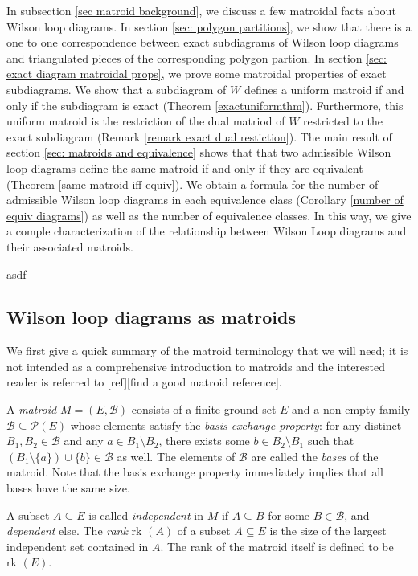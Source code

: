 \documentclass[11pt]{article}
\newcommand{\rk}{\textrm{rk }}
\newcommand{\cP}{\mathcal{P}}
\newcommand{\cB}{\mathcal{B}}
\theoremstyle{remark}
\theoremstyle{definition}
\begin{document}
In subsection \ref{sec matroid background}, we discuss a few matroidal facts about Wilson loop diagrams. In section \ref{sec: polygon partitions}, we show that there is a one to one correspondence between exact subdiagrams of Wilson loop diagrams and triangulated pieces of the corresponding polygon partion. In section \ref{sec: exact diagram matroidal props}, we prove some matroidal properties of exact subdiagrams. We show that a subdiagram of $W$ defines a uniform matroid if and only if the subdiagram is exact (Theorem \ref{exactuniformthm}). Furthermore, this uniform matroid is the restriction of the dual matriod of $W$ restricted to the exact subdiagram (Remark \ref{remark exact dual restiction}). The main result of section \ref{sec: matroids and equivalence} shows that that two admissible Wilson loop diagrams define the same matroid if and only if they are equivalent (Theorem \ref{same matroid iff equiv}). We obtain a formula for the number of admissible Wilson loop diagrams in each equivalence class (Corollary \ref{number of equiv diagrams}) {\color{violet}as well as the number of equivalence classes}. In this way, we give a comple characterization of the relationship between Wilson Loop diagrams and their associated matroids. 


asdf 

\subsection{Wilson loop diagrams as matroids\label{sec matroid background}}

We first give a quick summary of the matroid terminology that we will need; it is not intended as a comprehensive introduction to matroids and the interested reader is referred to [ref][find a good matroid reference].

A {\em matroid} $M = (E,\cB)$ consists of a finite ground set $E$ and a non-empty family $\cB \subseteq \cP(E)$ whose elements satisfy the {\em basis exchange property}: for any distinct $B_1,B_2 \in \cB$ and any $a \in B_1 \setminus B_2$, there exists some $b \in B_2 \setminus B_1$ such that $(B_1 \setminus \{a\})\cup \{b\} \in \cB$ as well. The elements of $\cB$ are called the {\em bases} of the matroid. Note that the basis exchange property immediately implies that all bases have the same size.

A subset $A \subseteq E$ is called {\em independent} in $M$ if $A \subseteq B$ for some $B \in \cB$, and {\em dependent} else. The {\em rank}  $\rk(A)$ of a subset $A \subseteq E$ is the size of the largest independent set contained in $A$. The rank of the matroid itself is defined to be $\rk(E)$.
\end{document}
